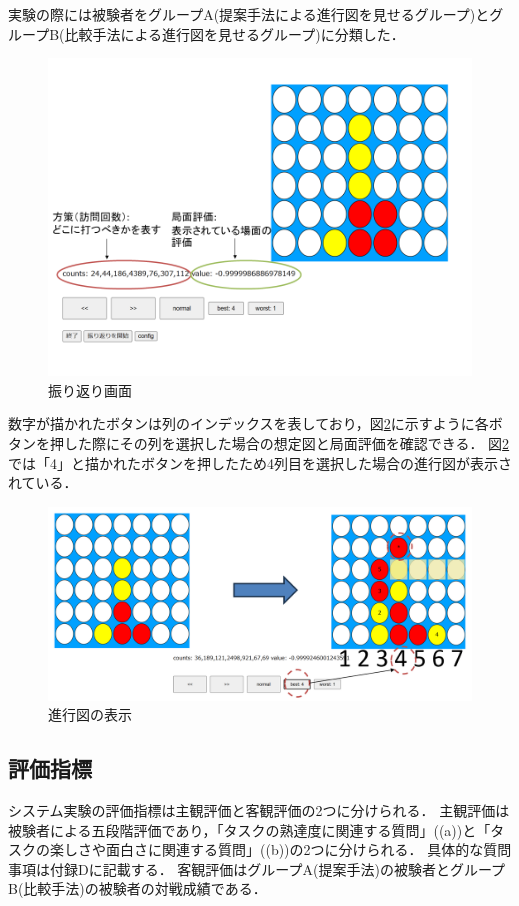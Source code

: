 実験の際には被験者をグループA(提案手法による進行図を見せるグループ)とグループB(比較手法による進行図を見せるグループ)に分類した．
\begin{figure}[t]
	\centering
	\includegraphics[width=\linewidth]{./figure/lookBack.png}
	\caption{振り返り画面}
	\label{fig:lookBack}
\end{figure}
数字が描かれたボタンは列のインデックスを表しており，図\ref{fig:trajSystem}に示すように各ボタンを押した際にその列を選択した場合の想定図と局面評価を確認できる．
図\ref{fig:trajSystem}では「4」と描かれたボタンを押したため4列目を選択した場合の進行図が表示されている．
\begin{figure}[t]
    \centering
    \includegraphics[width=\linewidth]{./figure/4-traj.png}
	\caption{進行図の表示}
	\label{fig:trajSystem}
\end{figure}
\subsection{評価指標}
システム実験の評価指標は主観評価と客観評価の2つに分けられる．
主観評価は被験者による五段階評価であり，「タスクの熟達度に関連する質問」((a))と「タスクの楽しさや面白さに関連する質問」((b))の2つに分けられる．
具体的な質問事項は付録Dに記載する．
客観評価はグループA(提案手法)の被験者とグループB(比較手法)の被験者の対戦成績である．

